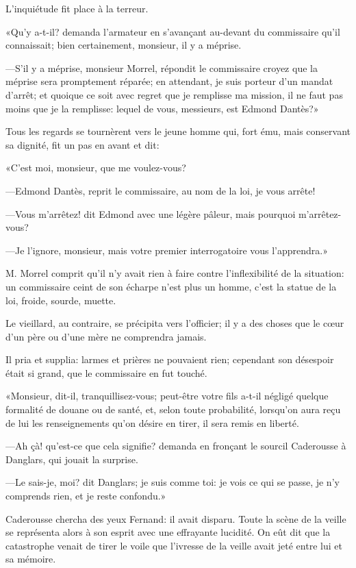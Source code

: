 L'inquiétude fit place à la terreur.

«Qu'y a-t-il? demanda l'armateur en s'avançant au-devant du commissaire qu'il connaissait; bien certainement, monsieur, il y a méprise.

—S'il y a méprise, monsieur Morrel, répondit le commissaire croyez que la méprise sera promptement réparée; en attendant, je suis porteur d'un mandat d'arrêt; et quoique ce soit avec regret que je remplisse ma mission, il ne faut pas moins que je la remplisse: lequel de vous, messieurs, est Edmond Dantès?»

Tous les regards se tournèrent vers le jeune homme qui, fort ému, mais conservant sa dignité, fit un pas en avant et dit:

«C'est moi, monsieur, que me voulez-vous?

—Edmond Dantès, reprit le commissaire, au nom de la loi, je vous arrête!

—Vous m'arrêtez! dit Edmond avec une légère pâleur, mais pourquoi m'arrêtez-vous?

—Je l'ignore, monsieur, mais votre premier interrogatoire vous l'apprendra.»

M. Morrel comprit qu'il n'y avait rien à faire contre l'inflexibilité de la situation: un commissaire ceint de son écharpe n'est plus un homme, c'est la statue de la loi, froide, sourde, muette.

Le vieillard, au contraire, se précipita vers l'officier; il y a des choses que le cœur d'un père ou d'une mère ne comprendra jamais.

Il pria et supplia: larmes et prières ne pouvaient rien; cependant son désespoir était si grand, que le commissaire en fut touché.

«Monsieur, dit-il, tranquillisez-vous; peut-être votre fils a-t-il négligé quelque formalité de douane ou de santé, et, selon toute probabilité, lorsqu'on aura reçu de lui les renseignements qu'on désire en tirer, il sera remis en liberté.

—Ah çà! qu'est-ce que cela signifie? demanda en fronçant le sourcil Caderousse à Danglars, qui jouait la surprise.

—Le sais-je, moi? dit Danglars; je suis comme toi: je vois ce qui se passe, je n'y comprends rien, et je reste confondu.»

Caderousse chercha des yeux Fernand: il avait disparu. Toute la scène de la veille se représenta alors à son esprit avec une effrayante lucidité. On eût dit que la catastrophe venait de tirer le voile que l'ivresse de la veille avait jeté entre lui et sa mémoire.

